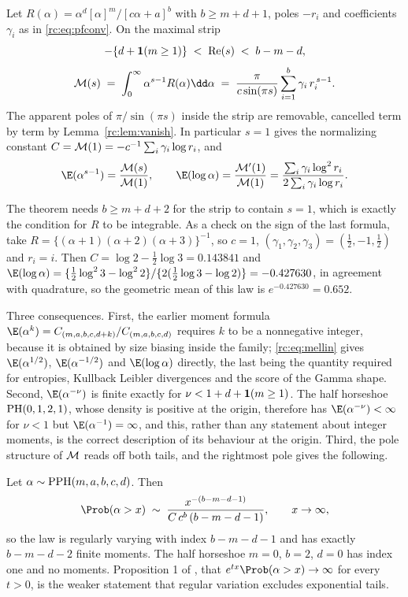 \begin{theorem}\label{rc:thm:mellin}
Let $R(\alpha)=\alpha^d[\alpha]^m/[c\alpha+a]^b$ with $b\ge m+d+1$, poles $-r_i$ and coefficients $\gamma_i$ as in \eqref{rc:eq:pfconv}. On the maximal strip
\[
-\{d+\mathbf{1}(m\ge1)\}\;<\;\operatorname{Re}(s)\;<\;b-m-d,
\]
\begin{equation}\label{rc:eq:mellin}
\rcM(s)\;=\;\int_0^\infty\alpha^{s-1}R(\alpha)\dd\alpha\;=\;\frac{\pi}{c\sin(\pi s)}\sum_{i=1}^b\gamma_i\,r_i^{\,s-1}.
\end{equation}
The apparent poles of $\pi/\sin(\pi s)$ inside the strip are removable, cancelled term by term by Lemma~\ref{rc:lem:vanish}. In particular $s=1$ gives the normalizing constant $C=\mathcal{M}(1)=-c^{-1}\sum_i\gamma_i\log r_i$, and
\[
\E(\alpha^{s-1})=\frac{\rcM(s)}{\rcM(1)},\qquad \E(\log\alpha)=\frac{\rcM'(1)}{\rcM(1)}=\frac{\sum_i\gamma_i\log^2r_i}{2\sum_i\gamma_i\log r_i}.
\]
\end{theorem}

The theorem needs $b\ge m+d+2$ for the strip to contain $s=1$, which is exactly the condition for $R$ to be integrable. As a check on the sign of the last formula, take $R=\{(\alpha+1)(\alpha+2)(\alpha+3)\}^{-1}$, so $c=1$, $(\gamma_1,\gamma_2,\gamma_3)=(\frac12,-1,\frac12)$ and $r_i=i$. Then $C=\log2-\frac12\log3=0.143841$ and $\E(\log\alpha)=\{\frac12\log^23-\log^22\}/\{2(\frac12\log3-\log2)\}=-0.427630$, in agreement with quadrature, so the geometric mean of this law is $e^{-0.427630}=0.652$.

Three consequences. First, the earlier moment formula $\E(\alpha^k)=C_{(m,a,b,c,d+k)}/C_{(m,a,b,c,d)}$ requires $k$ to be a nonnegative integer, because it is obtained by size biasing inside the family; \eqref{rc:eq:mellin} gives $\E(\alpha^{1/2})$, $\E(\alpha^{-1/2})$ and $\E(\log\alpha)$ directly, the last being the quantity required for entropies, Kullback Leibler divergences and the score of the Gamma shape. Second, $\E(\alpha^{-\nu})$ is finite exactly for $\nu<1+d+\mathbf{1}(m\ge1)$. The half horseshoe $\mathrm{PH}(0,1,2,1)$, whose density is positive at the origin, therefore has $\E(\alpha^{-\nu})<\infty$ for $\nu<1$ but $\E(\alpha^{-1})=\infty$, and this, rather than any statement about integer moments, is the correct description of its behaviour at the origin. Third, the pole structure of $\mathcal{M}$ reads off both tails, and the rightmost pole gives the following.

\begin{corollary}\label{rc:cor:tail}
Let $\alpha\sim\mathrm{PPH}(m,a,b,c,d)$. Then
\[
\Prob(\alpha>x)\;\sim\;\frac{x^{-(b-m-d-1)}}{C\,c^b\,(b-m-d-1)},\qquad x\to\infty,
\]
so the law is regularly varying with index $b-m-d-1$ and has exactly $b-m-d-2$ finite moments. The half horseshoe $m=0$, $b=2$, $d=0$ has index one and no moments. Proposition 1 of \citet{rc:wang2024}, that $e^{tx}\Prob(\alpha>x)\to\infty$ for every $t>0$, is the weaker statement that regular variation excludes exponential tails.
\end{corollary}

